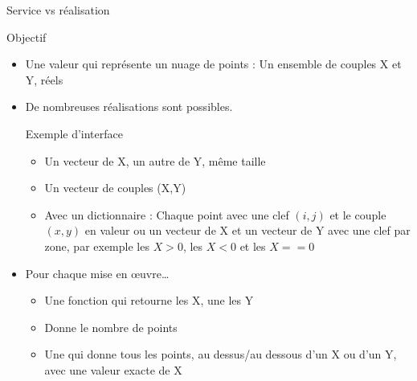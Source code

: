 \documentclass[compress,10pt,aspectratio=169]{beamer}
\begin{document}
    \begin{frame}[fragile]{Service vs réalisation}
        \scriptsize
        \begin{block}{\small Objectif}
        \begin{itemize}
        \item Une valeur qui représente un nuage de points : Un ensemble de couples X et Y, réels
        \item De nombreuses réalisations sont possibles.
      \begin{exampleblock}{\small Exemple d'interface}
        \begin{itemize}
          \scriptsize
          \item Un vecteur de X, un autre de Y, même taille
        \item Un vecteur de couples (X,Y)
        \item Avec un dictionnaire : Chaque point avec une clef $(i,j)$ et le couple $(x,y)$ en valeur ou un vecteur de X et un vecteur de Y avec une clef par zone, par exemple les $X>0$, les $X<0$ et les $X==0$
        \end{itemize}
      \end{exampleblock}
        \item Pour chaque mise en œuvre\ldots
        \begin{itemize}
          \scriptsize
          \item Une fonction qui retourne les X, une les Y
        \item Donne le nombre de points
        \item Une qui donne tous les points, au dessus/au dessous d'un X ou d'un Y, avec une valeur exacte de X
        \end{itemize}
      \end{itemize}
      \end{block}
        \end{frame}
\end{document}
